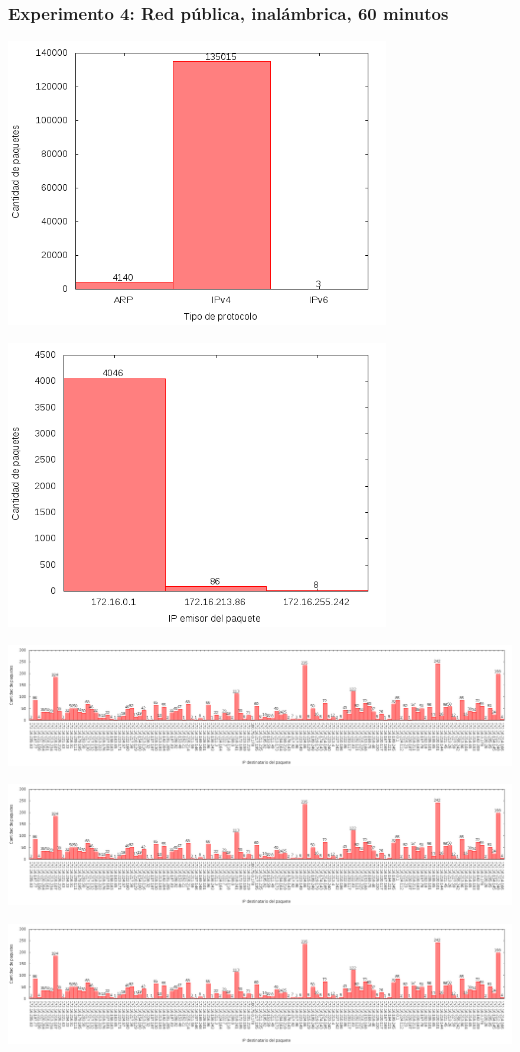 \subsubsection{Experimento 4: Red pública, inalámbrica, 60 minutos}

\includegraphics[width=10cm]{../mediciones/altop-wifi-60/altop60Protocolos.png}

\includegraphics[width=10cm]{../mediciones/altop-wifi-60/altop60IpsSrcArp.png}

\includegraphics[width=14cm,trim={0 0 35.95cm 0},clip]{../mediciones/altop-wifi-60/altop60IpsDstArp.png}

\includegraphics[width=14cm,trim={17cm 0 20.7cm 0},clip]{../mediciones/altop-wifi-60/altop60IpsDstArp.png}

\includegraphics[width=16cm,trim={32.26cm 0 0 0},clip]{../mediciones/altop-wifi-60/altop60IpsDstArp.png}
